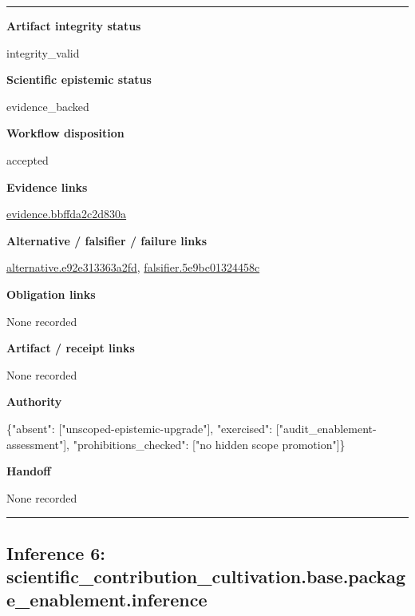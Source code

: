 \documentclass[10pt,a4paper]{article}
\newcommand{\TraceField}[2]{\par\noindent\textbf{#1}\par\noindent #2\par\smallskip}
\newenvironment{TraceDossier}{\par\medskip\noindent\hrule\medskip}{\medskip\hrule\par\medskip}
\begin{document}
\begin{TraceDossier}
\TraceField{Artifact integrity status}{integrity\_\allowbreak{}valid}

\TraceField{Scientific epistemic status}{evidence\_\allowbreak{}backed}

\TraceField{Workflow disposition}{accepted}

\TraceField{Evidence links}{\hyperlink{trace-evidence-ec61d23f15cd6f092a}{evidence.\allowbreak{}bbffda2c2d\allowbreak{}830a}}

\TraceField{Alternative / falsifier / failure links}{\hyperlink{trace-alternative-e4a409e76f8bb826c4}{alternativ\allowbreak{}e.\allowbreak{}e92e313363\allowbreak{}a2fd}, \hyperlink{trace-alternative-3beac0e2dd1cd5e1bd}{falsifier.\allowbreak{}5e9bc01324\allowbreak{}458c}}

\TraceField{Obligation links}{None recorded}

\TraceField{Artifact / receipt links}{None recorded}

\TraceField{Authority}{\{"absent":\allowbreak{} ["unscoped\allowbreak{}-\allowbreak{}epistemic-\allowbreak{}upgrade"],\allowbreak{} "exercised\allowbreak{}":\allowbreak{} ["audit\_\allowbreak{}enablement\allowbreak{}-\allowbreak{}assessment\allowbreak{}"], "prohibiti\allowbreak{}ons\_\allowbreak{}checked":\allowbreak{} ["no hidden scope promotion"\allowbreak{}]\}}

\TraceField{Handoff}{None recorded}

\end{TraceDossier}
\pagebreak[2]\subsection{Inference 6: scientific\allowbreak{}\_\allowbreak{}contributi\allowbreak{}on\_\allowbreak{}cultivatio\allowbreak{}n.\allowbreak{}base.\allowbreak{}package\_\allowbreak{}enablement\allowbreak{}.\allowbreak{}inference}\label{trace-inference-4d59019eeee6e09433}
\end{document}
